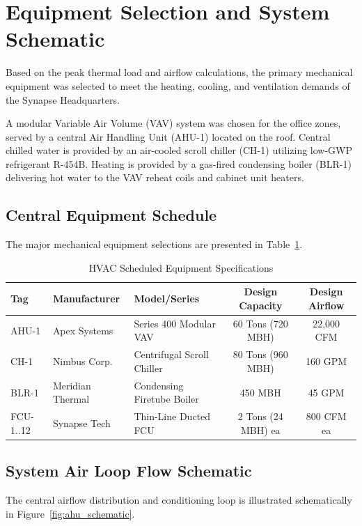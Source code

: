 \section{Equipment Selection and System Schematic}
\label{sec:equipment_selection}

Based on the peak thermal load and airflow calculations, the primary mechanical equipment was selected to meet the heating, cooling, and ventilation demands of the Synapse Headquarters.

A modular Variable Air Volume (VAV) system was chosen for the office zones, served by a central Air Handling Unit (AHU-1) located on the roof. Central chilled water is provided by an air-cooled scroll chiller (CH-1) utilizing low-GWP refrigerant R-454B. Heating is provided by a gas-fired condensing boiler (BLR-1) delivering hot water to the VAV reheat coils and cabinet unit heaters.

\subsection{Central Equipment Schedule}
The major mechanical equipment selections are presented in Table~\ref{tab:equipment_schedule}.

\begin{table}[htbp]
\centering
\caption{HVAC Scheduled Equipment Specifications}
\label{tab:equipment_schedule}
\begin{tabularx}{\textwidth}{l l X c c}
\toprule
\textbf{Tag} & \textbf{Manufacturer} & \textbf{Model/Series} & \textbf{Design Capacity} & \textbf{Design Airflow} \\
\midrule
AHU-1 & Apex Systems & Series 400 Modular VAV & 60 Tons (720 MBH) & 22,000 CFM \\
CH-1 & Nimbus Corp. & Centrifugal Scroll Chiller & 80 Tons (960 MBH) & 160 GPM \\
BLR-1 & Meridian Thermal & Condensing Firetube Boiler & 450 MBH & 45 GPM \\
FCU-1..12 & Synapse Tech & Thin-Line Ducted FCU & 2 Tons (24 MBH) ea & 800 CFM ea \\
\bottomrule
\end{tabularx}
\end{table}

\subsection{System Air Loop Flow Schematic}
The central airflow distribution and conditioning loop is illustrated schematically in Figure~\ref{fig:ahu_schematic}.

